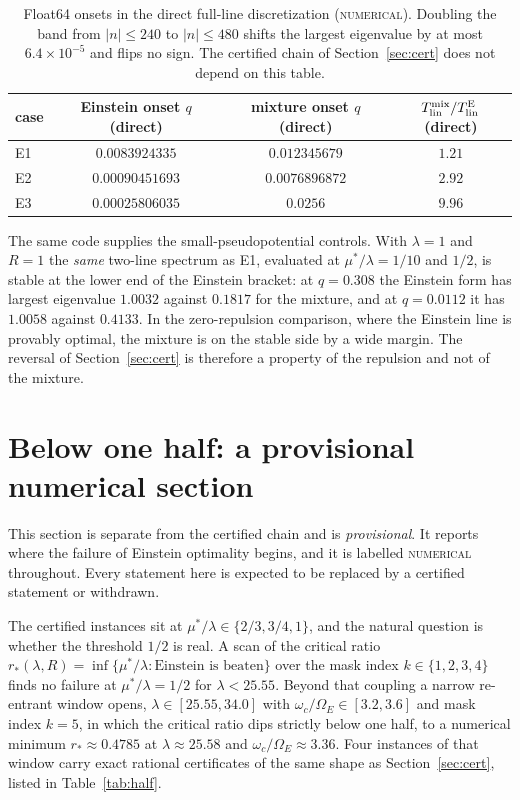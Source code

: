 \documentclass[11pt]{article}
\newcommand{\Tlin}{T_{\mathrm{lin}}}
\newcommand{\OmE}{\Omega_E}
\newcommand{\muS}{\mu^{*}}
\theoremstyle{definition}
\theoremstyle{remark}
\begin{document}
\begin{table}[t]
\centering
\footnotesize
\setlength{\tabcolsep}{6pt}
\begin{tabular}{@{}lccc@{}}
\toprule
case & Einstein onset $q$ (direct) & mixture onset $q$ (direct) & $\Tlin^{\rm mix}/\Tlin^{\rm E}$ (direct)\\
\midrule
E1 & $0.0083924335$ & $0.012345679$ & $1.21$\\
E2 & $0.00090451693$ & $0.0076896872$ & $2.92$\\
E3 & $0.00025806035$ & $0.0256$ & $9.96$\\
\bottomrule
\end{tabular}
\caption{Float64 onsets in the direct full-line discretization (\textsc{numerical}). Doubling
the band from $|n|\le240$ to $|n|\le480$ shifts the largest eigenvalue by at most
$6.4\times10^{-5}$ and flips no sign. The certified chain of Section~\ref{sec:cert} does not
depend on this table.}
\label{tab:direct}
\end{table}

The same code supplies the small-pseudopotential controls. With $\lambda=1$ and $R=1$ the
\emph{same} two-line spectrum as E1, evaluated at $\muS/\lambda=1/10$ and $1/2$, is stable
at the lower end of the Einstein bracket: at $q=0.308$ the Einstein form has largest
eigenvalue $1.0032$ against $0.1817$ for the mixture, and at $q=0.0112$ it has $1.0058$
against $0.4133$. In the zero-repulsion comparison, where the Einstein line is provably
optimal, the mixture is on the stable side by a wide margin. The reversal of
Section~\ref{sec:cert} is therefore a property of the repulsion and not of the mixture.

\section{Below one half: a provisional numerical section}\label{sec:half}

This section is separate from the certified chain and is \emph{provisional}. It reports
where the failure of Einstein optimality begins, and it is labelled \textsc{numerical}
throughout. Every statement here is expected to be replaced by a certified statement or
withdrawn.

The certified instances sit at $\muS/\lambda\in\{2/3,3/4,1\}$, and the natural question is
whether the threshold $1/2$ is real. A scan of the critical ratio
$r_*(\lambda,R)=\inf\{\muS/\lambda:\text{Einstein is beaten}\}$ over the mask index
$k\in\{1,2,3,4\}$ finds no failure at $\muS/\lambda=1/2$ for $\lambda<25.55$. Beyond that
coupling a narrow re-entrant window opens, $\lambda\in[25.55,34.0]$ with
$\omega_c/\OmE\in[3.2,3.6]$ and mask index $k=5$, in which the critical ratio dips strictly
below one half, to a numerical minimum $r_*\approx0.4785$ at $\lambda\approx25.58$ and
$\omega_c/\OmE\approx3.36$. Four instances of that window carry exact rational certificates
of the same shape as Section~\ref{sec:cert}, listed in Table~\ref{tab:half}.
\end{document}

